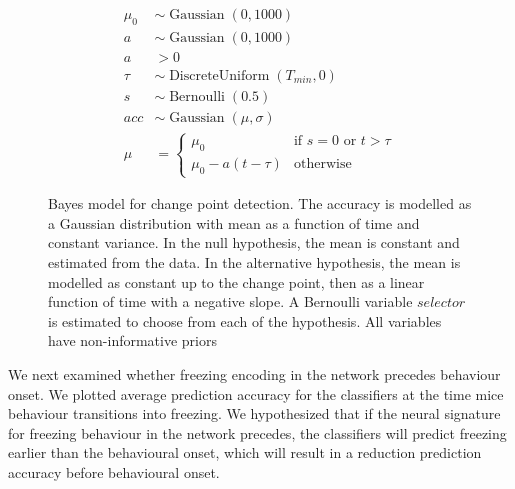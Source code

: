\begin{figure}[h]
    \centering
    \begin{minipage}[b]{0.45\linewidth}
        
    \end{minipage}
    \begin{minipage}[b]{0.45\linewidth}
        \begin{align*}
            \mu_0 &\sim \operatorname{Gaussian}(0, 1000) \\
            a &\sim \operatorname{Gaussian}(0, 1000) \\
            a &> 0 \\
            \tau &\sim \operatorname{DiscreteUniform}(T_{min}, 0) \\
            s &\sim \operatorname{Bernoulli}(0.5) \\
            acc &\sim \operatorname{Gaussian}(\mu, \sigma) \\
            \mu &=
                \begin{cases}
                    \mu_0 & \text{if }s=0\text{ or }t>\tau \\
                    \mu_0 - a(t-\tau) & \text{otherwise}
                \end{cases}
        \end{align*}
    \end{minipage}
    \caption[Bayes model for change point detection.]{Bayes model for change point detection. The accuracy is modelled as a Gaussian distribution with mean as a function of time and constant variance. In the null hypothesis, the mean is constant and estimated from the data. In the alternative hypothesis, the mean is modelled as constant up to the change point, then as a linear function of time with a negative slope. A Bernoulli variable $selector$ is estimated to choose from each of the hypothesis. All variables have non-informative priors \label{f.ad.bayesmodel}}
\end{figure}

We next examined whether freezing encoding in the network precedes behaviour onset. We plotted average prediction accuracy for the classifiers at the time mice behaviour transitions into freezing. We hypothesized that if the neural signature for freezing behaviour in the network precedes, the classifiers will predict freezing earlier than the behavioural onset, which will result in a reduction prediction accuracy before behavioural onset.

